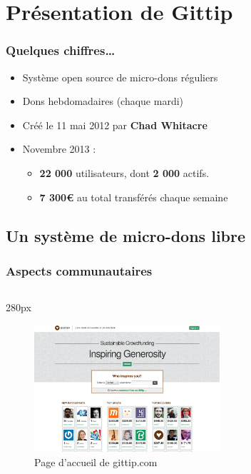     \section{Présentation de Gittip}


\begin{frame}
\frametitle{Quelques chiffres\ldots}

\begin{itemize}
    \itemsep1.5em
    \item Système open source de micro-dons réguliers
    \item Dons hebdomadaires (chaque mardi)
    \item Créé le 11 mai 2012 par \textbf{Chad Whitacre}
    \item Novembre 2013 :
        \begin{itemize}
            \item \textbf{22 000} utilisateurs, dont \textbf{2 000} actifs.
            \item \textbf{7 300\euro{}} au total transférés chaque semaine
        \end{itemize}
\end{itemize}
\end{frame}


    \subsection{Un système de micro-dons libre}


{
\logo{}
\begin{frame}
\frametitle{Aspects communautaires}
\begin{center}
\begin{columns}
\begin{column}{280px}
{
    \begin{figure}[h!]
        \centering
        \includegraphics[width=260px]{images/section1/homepage-gittip.eps}
        \caption{Page d'accueil de gittip.com}
    \end{figure}
}
\end{column}
\end{columns}
\end{center}
\end{frame}
}


